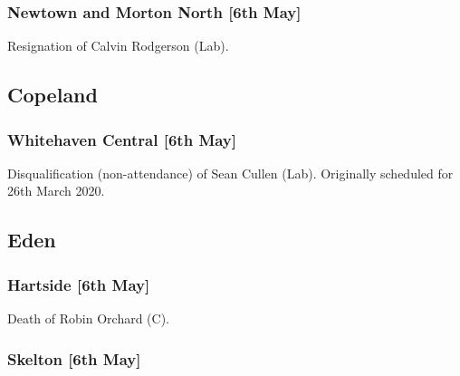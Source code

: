 \documentclass[a4paper,openany]{book}
\begin{document}
\begin{resultsiii}
\subsubsection*{Newtown and Morton North \hspace*{\fill}\nolinebreak[1]%
	\enspace\hspace*{\fill}
	[6th May]}


Resignation of Calvin Rodgerson (Lab).

\subsection*{Copeland}

\subsubsection*{Whitehaven Central \hspace*{\fill}\nolinebreak[1]%
	\enspace\hspace*{\fill}
	[6th May]}


Disqualification (non-attendance) of Sean Cullen (Lab).  Originally scheduled for 26th March 2020.

\subsection*{Eden}

\subsubsection*{Hartside \hspace*{\fill}\nolinebreak[1]%
	\enspace\hspace*{\fill}
	[6th May]}


Death of Robin Orchard (C).

\subsubsection*{Skelton \hspace*{\fill}\nolinebreak[1]%
	\enspace\hspace*{\fill}
	[6th May]}


\end{resultsiii}
\end{document}
